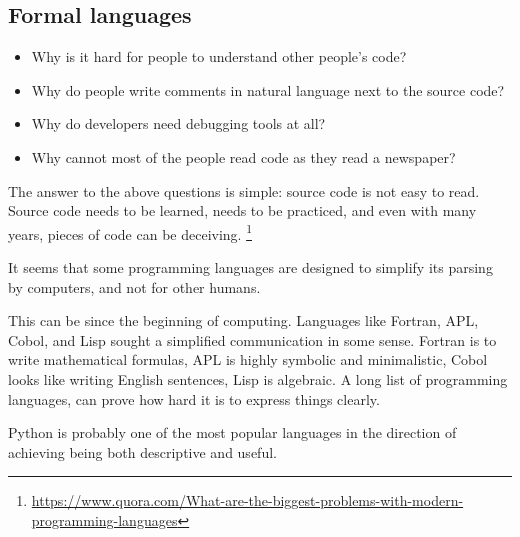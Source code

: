 
\subsection{Formal languages}

\begin{itemize}
    \item Why is it hard for people to understand other people's code?
    \item Why do people write comments in natural language next to the source code?
    \item Why do developers need debugging tools at all?
    \item Why cannot most of the people read code as they read a newspaper?
\end{itemize}
The answer to the above questions is simple: source code is not easy to read\cite{Casalnuovo2019}.
Source code needs to be learned, needs to be practiced, and even with many years, pieces of code can be deceiving.
\footnote{\url{https://www.quora.com/What-are-the-biggest-problems-with-modern-programming-languages}}

It seems that some programming languages are designed to simplify its parsing by computers, and not for other humans.

This can be since the beginning of computing.
Languages like Fortran, APL, Cobol, and Lisp sought a simplified communication in some sense.
Fortran is to write mathematical formulas, APL is highly symbolic and minimalistic, Cobol looks like writing English sentences, Lisp is algebraic.
A long list of programming languages, can prove how hard it is to express things clearly.

Python is probably one of the most popular languages in the direction of achieving being both descriptive and useful.

